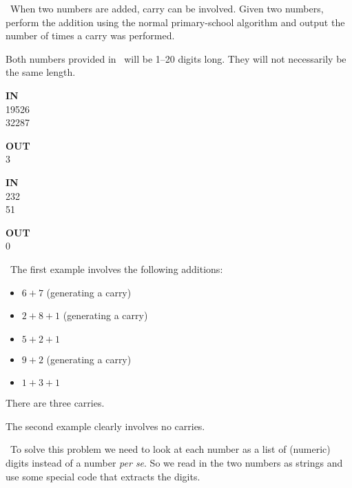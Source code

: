 

\Question\ When two numbers are added, carry can be involved. Given two numbers, perform
the addition using the normal primary-school algorithm and output the number of times a
carry was performed.

Both numbers provided in \IN\ will be 1--20 digits long. They will not necessarily be the
same length.

\Sample

\begin{minipage}[t]{0.2\textwidth}
  \ttfamily
  \textbf{IN} \\
  19526\\
  32287
\end{minipage} %
\begin{minipage}[t]{0.2\textwidth}
  \ttfamily
  \textbf{OUT} \\
  3
\end{minipage}

\vspace{6pt}
\begin{minipage}[t]{0.2\textwidth}
  \ttfamily
  \textbf{IN} \\
  232\\
  51
\end{minipage} %
\begin{minipage}[t]{0.2\textwidth}
  \ttfamily
  \textbf{OUT} \\
  0
\end{minipage}

\Explanation\ The first example involves the following additions:
\begin{itemize}
  \item $6+7$ (generating a carry)
  \item $2+8+1$ (generating a carry)
  \item $5+2+1$
  \item $9+2$ (generating a carry)
  \item $1+3+1$
\end{itemize}

There are three carries.

The second example clearly involves no carries.

\Scratch\ To solve this problem we need to look at each number as a list of (numeric)
digits instead of a number \emph{per se}. So we read in the two numbers as strings and use
some special code that extracts the digits.

